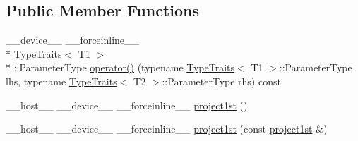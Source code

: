 \subsection*{Public Member Functions}
\begin{DoxyCompactItemize}
\item 
\-\_\-\-\_\-device\-\_\-\-\_\- \-\_\-\-\_\-forceinline\-\_\-\-\_\- \\*
\hyperlink{structcv_1_1gpu_1_1device_1_1TypeTraits}{Type\-Traits}$<$ T1 $>$\\*
\-::Parameter\-Type \hyperlink{structcv_1_1gpu_1_1device_1_1project1st_a71245c505bed35caa2b0f7228e555ecc}{operator()} (typename \hyperlink{structcv_1_1gpu_1_1device_1_1TypeTraits}{Type\-Traits}$<$ T1 $>$\-::Parameter\-Type lhs, typename \hyperlink{structcv_1_1gpu_1_1device_1_1TypeTraits}{Type\-Traits}$<$ T2 $>$\-::Parameter\-Type rhs) const 
\item 
\-\_\-\-\_\-host\-\_\-\-\_\- \-\_\-\-\_\-device\-\_\-\-\_\- \-\_\-\-\_\-forceinline\-\_\-\-\_\- \hyperlink{structcv_1_1gpu_1_1device_1_1project1st_ae0ffa142aa8f6b71af7af76804c8291a}{project1st} ()
\item 
\-\_\-\-\_\-host\-\_\-\-\_\- \-\_\-\-\_\-device\-\_\-\-\_\- \-\_\-\-\_\-forceinline\-\_\-\-\_\- \hyperlink{structcv_1_1gpu_1_1device_1_1project1st_a8e64f64d684da9f6ac8f9814fb00e166}{project1st} (const \hyperlink{structcv_1_1gpu_1_1device_1_1project1st}{project1st} \&)
\end{DoxyCompactItemize}


